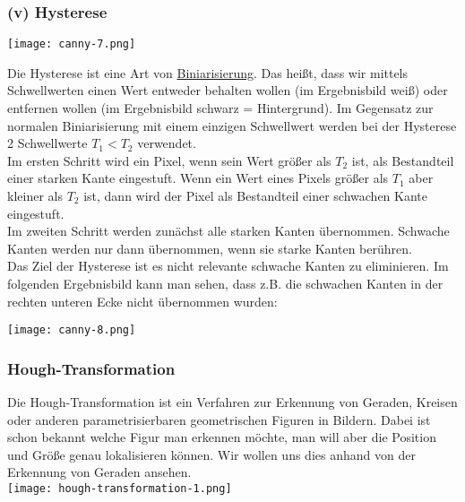 \subsubsection*{(v) Hysterese}

\texttt{[image: canny-7.png]}

Die Hysterese ist eine Art von \hyperref[sec:biniarisierung]{Biniarisierung}. Das heißt, dass wir mittels Schwellwerten einen Wert entweder behalten wollen (im Ergebnisbild weiß) oder entfernen wollen (im Ergebnisbild schwarz = Hintergrund). Im Gegensatz zur normalen Biniarisierung mit einem einzigen Schwellwert werden bei der Hysterese 2 Schwellwerte $ T_{1} < T_{2} $ verwendet.\\
Im ersten Schritt wird ein Pixel, wenn sein Wert größer als $T_{2}$ ist, als Bestandteil einer starken Kante eingestuft. Wenn ein Wert eines Pixels größer als $ T_{1} $ aber kleiner als $T_{2}$ ist, dann wird der Pixel als Bestandteil einer schwachen Kante eingestuft.\\
Im zweiten Schritt werden zunächst alle starken Kanten übernommen. Schwache Kanten werden nur dann übernommen, wenn sie starke Kanten berühren.\\

Das Ziel der Hysterese ist es nicht relevante schwache Kanten zu eliminieren. Im folgenden Ergebnisbild kann man sehen, dass z.B. die schwachen Kanten in der rechten unteren Ecke nicht übernommen wurden:

\texttt{[image: canny-8.png]}

\subsubsection{Hough-Transformation}

Die Hough-Transformation ist ein Verfahren zur Erkennung von Geraden, Kreisen oder anderen parametrisierbaren geometrischen Figuren in Bildern. Dabei ist schon bekannt welche Figur man erkennen möchte, man will aber die Position und Größe genau lokalisieren können. Wir wollen uns dies anhand von der Erkennung von Geraden ansehen.\\

\texttt{[image: hough-transformation-1.png]}


